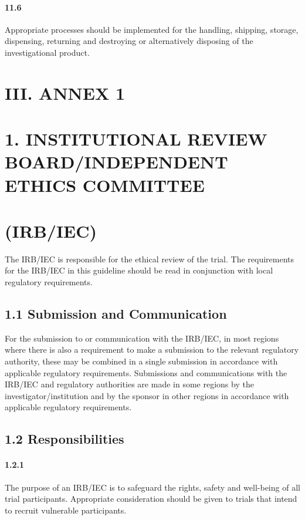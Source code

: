 \documentclass[11pt]{article}
\begin{document}
\paragraph{11.6} Appropriate processes should be implemented for the handling, shipping, storage, dispensing, returning and destroying or alternatively disposing of the investigational product.

\section{III. ANNEX 1}

\section{1. INSTITUTIONAL REVIEW BOARD/INDEPENDENT ETHICS COMMITTEE}

\section{(IRB/IEC)}

The IRB/IEC is responsible for the ethical review of the trial. The requirements for the IRB/IEC in this guideline should be read in conjunction with local regulatory requirements.


\subsection{1.1 Submission and Communication}

For the submission to or communication with the IRB/IEC, in most regions where there is also a requirement to make a submission to the relevant regulatory authority, these may be combined in a single submission in accordance with applicable regulatory requirements. Submissions and communications with the IRB/IEC and regulatory authorities are made in some regions by the investigator/institution and by the sponsor in other regions in accordance with applicable regulatory requirements.


\subsection{1.2 Responsibilities}

\paragraph{1.2.1} The purpose of an IRB/IEC is to safeguard the rights, safety and well-being of all trial participants. Appropriate consideration should be given to trials that intend to recruit vulnerable participants.
\end{document}
